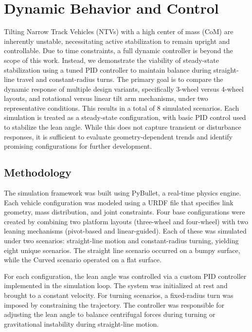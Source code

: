 \section{Dynamic Behavior and Control}

Tilting Narrow Track Vehicles (NTVs) with a high center of mass (CoM) are inherently unstable, necessitating active stabilization to remain upright and controllable. Due to time constraints, a full dynamic controller is beyond the scope of this work. Instead, we demonstrate the viability of steady-state stabilization using a tuned PID controller to maintain balance during straight-line travel and constant-radius turns. The primary goal is to compare the dynamic response of multiple design variants, specifically 3-wheel versus 4-wheel layouts, and rotational versus linear tilt arm mechanisms, under two representative conditions. This results in a total of 8 simulated scenarios. Each simulation is treated as a steady-state configuration, with basic PID control used to stabilize the lean angle. While this does not capture transient or disturbance responses, it is sufficient to evaluate geometry-dependent trends and identify promising configurations for further development.


\subsection{Methodology}

The simulation framework was built using PyBullet, a real-time physics engine. Each vehicle configuration was modeled using a URDF file that specifies link geometry, mass distribution, and joint constraints. Four base configurations were created by combining two platform layouts (three-wheel and four-wheel) with two leaning mechanisms (pivot-based and linear-guided). Each of these was simulated under two scenarios: straight-line motion and constant-radius turning, yielding eight unique scenarios. The straight line scenario occurred on a bumpy surface, while the Curved scenario operated on a flat surface.

For each configuration, the lean angle was controlled via a custom PID controller implemented in the simulation loop. The system was initialized at rest and brought to a constant velocity. For turning scenarios, a fixed-radius turn was imposed by constraining the trajectory. The controller was responsible for adjusting the lean angle to balance centrifugal forces during turning or gravitational instability during straight-line motion.

